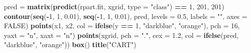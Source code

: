 \documentclass[
]{book}
\newenvironment{Shaded}{\begin{snugshade}}{\end{snugshade}}
\newcommand{\AttributeTok}[1]{\textcolor[rgb]{0.13,0.29,0.53}{#1}}
\newcommand{\ConstantTok}[1]{\textcolor[rgb]{0.56,0.35,0.01}{#1}}
\newcommand{\DecValTok}[1]{\textcolor[rgb]{0.00,0.00,0.81}{#1}}
\newcommand{\FloatTok}[1]{\textcolor[rgb]{0.00,0.00,0.81}{#1}}
\newcommand{\FunctionTok}[1]{\textcolor[rgb]{0.13,0.29,0.53}{\textbf{#1}}}
\newcommand{\NormalTok}[1]{#1}
\newcommand{\OtherTok}[1]{\textcolor[rgb]{0.56,0.35,0.01}{#1}}
\newcommand{\SpecialCharTok}[1]{\textcolor[rgb]{0.81,0.36,0.00}{\textbf{#1}}}
\newcommand{\StringTok}[1]{\textcolor[rgb]{0.31,0.60,0.02}{#1}}
\begin{document}
\begin{Shaded}
\begin{Highlighting}[]
\NormalTok{pred }\OtherTok{=} \FunctionTok{matrix}\NormalTok{(}\FunctionTok{predict}\NormalTok{(rpart.fit, xgrid, }\AttributeTok{type =} \StringTok{"class"}\NormalTok{) }\SpecialCharTok{==} \DecValTok{1}\NormalTok{,}
    \DecValTok{201}\NormalTok{, }\DecValTok{201}\NormalTok{)}
\FunctionTok{contour}\NormalTok{(}\FunctionTok{seq}\NormalTok{(}\SpecialCharTok{{-}}\DecValTok{1}\NormalTok{, }\DecValTok{1}\NormalTok{, }\FloatTok{0.01}\NormalTok{), }\FunctionTok{seq}\NormalTok{(}\SpecialCharTok{{-}}\DecValTok{1}\NormalTok{, }\DecValTok{1}\NormalTok{, }\FloatTok{0.01}\NormalTok{), pred, }\AttributeTok{levels =} \FloatTok{0.5}\NormalTok{,}
    \AttributeTok{labels =} \StringTok{""}\NormalTok{, }\AttributeTok{axes =} \ConstantTok{FALSE}\NormalTok{)}
\FunctionTok{points}\NormalTok{(x1, x2, }\AttributeTok{col =} \FunctionTok{ifelse}\NormalTok{(y }\SpecialCharTok{==} \DecValTok{1}\NormalTok{, }\StringTok{"darkblue"}\NormalTok{, }\StringTok{"orange"}\NormalTok{), }\AttributeTok{pch =} \DecValTok{16}\NormalTok{,}
    \AttributeTok{yaxt =} \StringTok{"n"}\NormalTok{, }\AttributeTok{xaxt =} \StringTok{"n"}\NormalTok{)}
\FunctionTok{points}\NormalTok{(xgrid, }\AttributeTok{pch =} \StringTok{"."}\NormalTok{, }\AttributeTok{cex =} \FloatTok{1.2}\NormalTok{, }\AttributeTok{col =} \FunctionTok{ifelse}\NormalTok{(pred, }\StringTok{"darkblue"}\NormalTok{,}
    \StringTok{"orange"}\NormalTok{))}
\FunctionTok{box}\NormalTok{()}
\FunctionTok{title}\NormalTok{(}\StringTok{"CART"}\NormalTok{)}


\end{Highlighting}
\end{Shaded}
\end{document}
